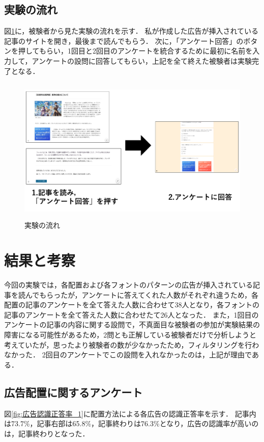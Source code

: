 \documentclass[12pt,a4j,titlepage]{ltjsarticle}
\begin{document}
\subsection{実験の流れ}
図\ref{fig:実験の流れ}に，被験者から見た実験の流れを示す．
私が作成した広告が挿入されている記事のサイトを開き，最後まで読んでもらう．
次に，「アンケート回答」のボタンを押してもらい，1回目と2回目のアンケートを統合するために最初に名前を入力して，アンケートの設問に回答してもらい，上記を全て終えた被験者は実験完了となる．

\begin{figure}[H]
\begin{center}
 \includegraphics[height=70mm]{figures/実験の流れ.pdf}
\end{center}
 \caption{実験の流れ}
 \label{fig:実験の流れ}
\end{figure}

\clearpage

\section{結果と考察}
今回の実験では，各配置および各フォントのパターンの広告が挿入されている記事を読んでもらったが，アンケートに答えてくれた人数がそれぞれ違うため，各配置の記事のアンケートを全て答えた人数に合わせて38人となり，各フォントの記事のアンケートを全て答えた人数に合わせたて26人となった．
また，1回目のアンケートの記事の内容に関する設問で，不真面目な被験者の参加が実験結果の障害になる可能性があるため，2問とも正解している被験者だけで分析しようと考えていたが，思ったより被験者の数が少なかったため，フィルタリングを行わなかった．
2回目のアンケートでこの設問を入れなかったのは，上記が理由である．

\subsection{広告配置に関するアンケート}
図\ref{fig:広告認識正答率_1}に配置方法による各広告の認識正答率を示す．
記事内は73.7\%，記事右部は65.8\%，記事終わりは76.3\%となり，広告の認識率が高いのは，記事終わりとなった．
\end{document}
